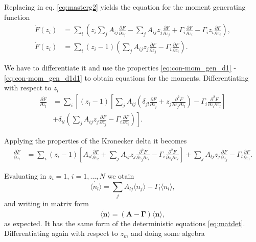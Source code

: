 Replacing in eq. \eqref{eq:masterg2} yields the equation for the moment generating function
\begin{equation*}
  \begin{split}
    \dot{F}(z_i) &= \sum_i\left( z_i\sum_jA_{ij}\frac{\partial F}{\partial z_j} - \sum_jA_{ij} z_j \frac{\partial F}{\partial z_j} + \Gamma_i\frac{\partial F}{\partial z_i} - \Gamma_iz_i\frac{\partial F}{\partial z_i}\right),\\
    \dot{F}(z_i) &= \sum_i(z_i-1)\left(\sum_jA_{ij} z_j \frac{\partial F}{\partial z_j} - \Gamma_i\frac{\partial F}{\partial z_i}\right).
  \end{split}
\end{equation*}

We have to differentiate it and use the properties \eqref{eq:con-mom_gen_d1} - \eqref{eq:con-mom_gen_d1d1} to obtain equations for the moments. Differentiating with respect to $z_l$
\begin{equation*}
\begin{split}
\frac{\partial \dot{F}}{\partial z_l} &= \sum_i\left[(z_i-1)\left[\sum_jA_{ij}\left(\delta_{jl}\frac{\partial F}{\partial z_j}+z_j\frac{\partial^2 F}{\partial z_j\partial z_l}\right)-\Gamma_i\frac{\partial^2 F}{\partial z_i\partial z_l}\right]\right.\\
&+\left.\delta_{il}\left(\sum_jA_{ij}z_j\frac{\partial F}{\partial z_j}-\Gamma_i\frac{\partial F}{\partial z_i}\right)\right].
\end{split}
\end{equation*}

Applying the properties of the Kronecker delta it becomes
\begin{equation*}
\begin{split}
\frac{\partial \dot{F}}{\partial z_l} &= \sum_i(z_i-1)\left[A_{il}\frac{\partial F}{\partial z_l}+\sum_jA_{ij}z_j\frac{\partial^2 F}{\partial z_j\partial z_l}-\Gamma_i\frac{\partial^2 F}{\partial z_i\partial z_l}\right]+\sum_jA_{lj}z_j\frac{\partial F}{\partial z_j}-\Gamma_l\frac{\partial F}{\partial z_l}.
\end{split}
\end{equation*}

Evaluating in $z_i=1$, $i=1,\dotsc,N$ we otain
\begin{equation*}
\dot{\langle n_l \rangle} = \sum_jA_{lj}\langle n_j\rangle-\Gamma_l\langle n_l\rangle,
\end{equation*}
and writing in matrix form
\begin{equation}
  \label{eq:mas-general_ave}
  \dot{\langle \mathbf{n}\rangle} = (\mathbf{A}-\mathbf{\Gamma})\langle \mathbf{n}\rangle,
\end{equation}
as expected. It has the same form of the deterministic equations \eqref{eq:matdet}. Differentiating again with respect to $z_m$ and doing some algebra

